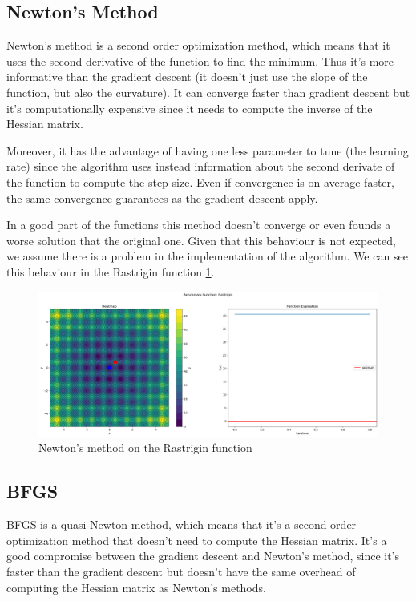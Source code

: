 \subsection{Newton's Method}
\label{sec:newtons-method}
Newton's method is a second order optimization method, which means that it uses the second derivative of the function to find the minimum. Thus it's more informative than the gradient descent (it doesn't just use the slope of the function, but also the curvature). It can converge faster than gradient descent but it's computationally expensive since it needs to compute the inverse of the Hessian matrix.

Moreover, it has the advantage of having one less parameter to tune (the learning rate) since the algorithm uses instead information about the second derivate of the function to compute the step size.
Even if convergence is on average faster, the same convergence guarantees as the gradient descent apply.

In a good part of the functions this method doesn't converge or even founds a worse solution that the original one. Given that this behaviour is not expected, we assume there is a problem in the implementation of the algorithm. We can see this behaviour in the Rastrigin function \ref{fig:nm-rastrigin}.
\begin{figure}[H]
    \centering
    \includegraphics[width=0.8\linewidth]{lab3/imgs/nm_rastrigin.png}
    \caption{Newton's method on the Rastrigin function}
    \label{fig:nm-rastrigin}
\end{figure}


\subsection{BFGS}
\label{sec:bfgs}
BFGS is a quasi-Newton method, which means that it's a second order optimization method that doesn't need to compute the Hessian matrix. It's a good compromise between the gradient descent and Newton's method, since it's faster than the gradient descent but doesn't have the same overhead of computing the Hessian matrix as Newton's methods.

